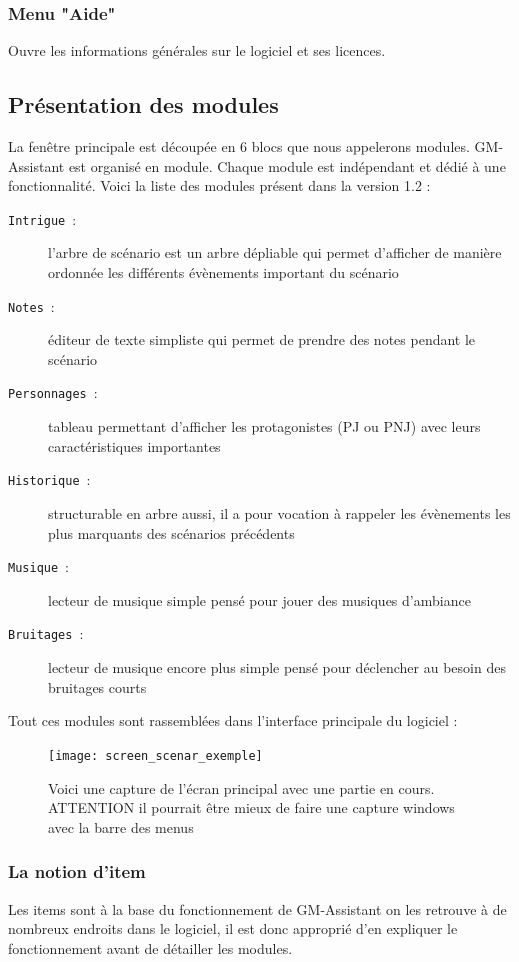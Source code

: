 \documentclass[a4paper,12pt]{article}
\newcommand*{\GMA}{GM-Assistant\xspace}
\newcommand*{\interfaceitem}[1]{\texttt{#1}}
\newcommand*{\guillemets}[1]{\og #1\fg{}\xspace}
\begin{document}
\subsubsection{Menu "Aide"} Ouvre les informations générales sur le logiciel et ses licences.

\subsection{Présentation des modules}\label{modules}
\label{sec:modules}

La fenêtre principale est découpée en 6 blocs que nous appelerons modules.
\GMA est organisé en module. Chaque module est indépendant et dédié à une fonctionnalité. Voici la liste des modules présent  dans la version 1.2 :
\begin{description}
    \item[\interfaceitem{Intrigue}~:]{l'arbre de scénario est un arbre \guillemets{dépliable} qui permet d'afficher de manière ordonnée les différents évènements important du scénario}
    \item[\interfaceitem{Notes}~:]{éditeur de texte simpliste qui permet de prendre des notes pendant le scénario}
    \item[\interfaceitem{Personnages}~:]{tableau permettant d'afficher les protagonistes (PJ ou PNJ) avec leurs caractéristiques importantes}
    \item[\interfaceitem{Historique}~:]{structurable en arbre aussi, il a pour vocation à rappeler les évènements les plus marquants des scénarios précédents}
    \item[\interfaceitem{Musique}~:]{lecteur de musique simple pensé pour jouer des musiques d'ambiance}
    \item[\interfaceitem{Bruitages}~:]{lecteur de musique encore plus simple pensé pour déclencher au besoin des bruitages courts}
\end{description}
Tout ces modules sont rassemblées dans l'interface principale du logiciel :
\begin{figure}[h]
    \texttt{[image: screen\_scenar\_exemple]}
    \caption{Voici une capture de l'écran principal avec une partie en cours.
    ATTENTION il pourrait être mieux de faire une capture windows avec la barre des menus}
\end{figure}


\subsubsection{La notion d'item}\label{item}
Les items sont à la base du fonctionnement de \GMA on les retrouve à de nombreux endroits dans le logiciel, il est donc approprié d'en expliquer le fonctionnement avant de détailler les modules.
\end{document}
